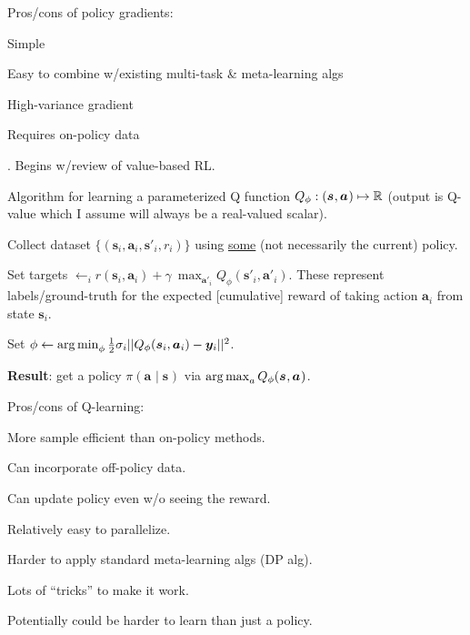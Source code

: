 \documentclass[11pt]{article}
\renewcommand\vec[2][]{\bm{#2}_{#1}}
\begin{document}
Pros/cons of policy gradients:
\begin{compactitem}
	\item[\green{\cmark}] Simple
	\item[\green{\cmark}] Easy to combine w/existing multi-task \& meta-learning algs
	
	\item[\red{\xmark}] High-variance gradient
	\item[\red{\xmark}] Requires on-policy data
\end{compactitem}


. Begins w/review of value-based RL.

\begin{algorithm}
	Algorithm for learning a parameterized Q function $Q_{\phi}: (\vec s, \vec a) \mapsto \R$ (output is Q-value which I assume will always be a real-valued scalar). 
	\begin{compactenum}
		\item Collect dataset $\{  (\vec[i]{s}, \vec[i]{a}, \vec[i]{s'}, r_i)  \}$ using \underline{some} (not necessarily the current) policy. 
		\item Set targets $\vec[i] \leftarrow r(\vec[i]{s}, \vec[i]{a}) + \gamma ~ \max_{\vec[i]{a'}} Q_{\phi}(\vec[i]{s'}, \vec[i]{a'})$. These represent labels/ground-truth for the expected [cumulative] reward of taking action $\vec[i]{a}$ from state $\vec[i]{s}$. 
		\item Set $\phi \leftarrow \argmin_{\phi} \onehalf \sigma_i ||   Q_{\phi}(\vec[i]{s}, \vec[i]{a}) - \vec[i]{y}       ||^2$. 
	\end{compactenum}

	\textbf{Result}: get a policy $\pi(\vec a \mid \vec s)$ via $\argmax_{a} Q_{\phi}(\vec s, \vec a)$. 
\end{algorithm} 

Pros/cons of Q-learning:
\begin{compactitem}
	\item[\green{\cmark}] More sample efficient than on-policy methods.
	\item[\green{\cmark}] Can incorporate off-policy data. 
	\item[\green{\cmark}] Can update policy even w/o seeing the reward. 
	\item[\green{\cmark}] Relatively easy to parallelize. 
	
	\item[\red{\xmark}] Harder to apply standard meta-learning algs (DP alg).
	\item[\red{\xmark}] Lots of ``tricks'' to make it work.
	\item[\red{\xmark}] Potentially could be harder to learn than just a policy.
\end{compactitem}
\end{document}
